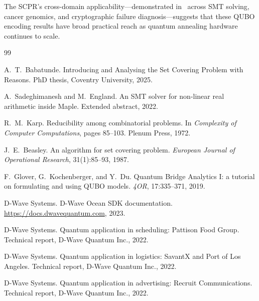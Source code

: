 \documentclass[11pt,a4paper]{article}
\theoremstyle{plain}
\theoremstyle{definition}
\theoremstyle{remark}
\newcommand{\SCPR}{\textup{SCPR}}
\newcommand{\QUBO}{\textup{QUBO}}
\begin{document}
The \SCPR{}'s cross-domain applicability---demonstrated in~\cite{babatunde2025thesis}
across SMT solving, cancer genomics, and cryptographic failure diagnosis---suggests
that these \QUBO{} encoding results have broad practical reach as quantum annealing
hardware continues to scale.


\begin{thebibliography}{99}

A.~T.~Babatunde.
\newblock Introducing and Analysing the Set Covering Problem with Reasons.
\newblock PhD thesis, Coventry University, 2025.

A.~Sadeghimanesh and M.~England.
\newblock An SMT solver for non-linear real arithmetic inside Maple.
\newblock Extended abstract, 2022.

R.~M.~Karp.
\newblock Reducibility among combinatorial problems.
\newblock In \textit{Complexity of Computer Computations}, pages 85--103.
  Plenum Press, 1972.

J.~E.~Beasley.
\newblock An algorithm for set covering problem.
\newblock \textit{European Journal of Operational Research}, 31(1):85--93, 1987.

F.~Glover, G.~Kochenberger, and Y.~Du.
\newblock Quantum Bridge Analytics I: a tutorial on formulating and using QUBO models.
\newblock \textit{4OR}, 17:335--371, 2019.

D-Wave Systems.
\newblock D-Wave Ocean SDK documentation.
\newblock \url{https://docs.dwavequantum.com}, 2023.

D-Wave Systems.
\newblock Quantum application in scheduling: Pattison Food Group.
\newblock Technical report, D-Wave Quantum Inc., 2022.

D-Wave Systems.
\newblock Quantum application in logistics: SavantX and Port of Los Angeles.
\newblock Technical report, D-Wave Quantum Inc., 2022.

D-Wave Systems.
\newblock Quantum application in advertising: Recruit Communications.
\newblock Technical report, D-Wave Quantum Inc., 2022.

\end{thebibliography}
\end{document}
